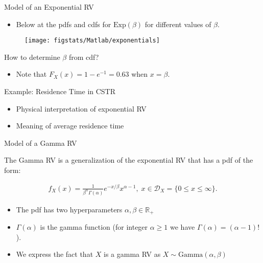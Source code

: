 \documentclass[9pt]{beamer}
\begin{document}
%
\begin{frame}{Model of an Exponential RV}
\begin{itemize}
\item Below at the pdfs and cdfs for $\textrm{Exp}(\beta)$ for different values of $\beta$.
\end{itemize}
\begin{figure}[!htb]
    \centering
	\texttt{[image: figstats/Matlab/exponentials]}
\end{figure}
\begin{block}{}
\begin{center}
How to determine $\beta$ from cdf? 
\end{center}
\end{block}
\pause
\begin{itemize}
\item Note that $F_X(x)=1-e^{-1}=0.63$ when $x=\beta$. 
\end{itemize}
\end{frame}

%
\begin{frame}{Example: Residence Time in CSTR}
\begin{block}{}
\begin{itemize}
\item Physical interpretation of exponential RV
\item Meaning of average residence time
\end{itemize}
\end{block}
\begin{center}
\end{center}
\end{frame}

%
\begin{frame}{Model of a Gamma RV}

The Gamma RV is a generalization of the exponential RV that has a pdf of the form:
\begin{block}{}
\begin{align*}
f_X(x)=\frac{1}{\beta^\alpha \Gamma(\alpha)}e^{-x/\beta}x^{\alpha-1},\; x\in \mathcal{D}_X=\{0\leq x\leq \infty\}.
\end{align*}
\end{block}
\begin{itemize}
\item The pdf has two hyperparameters $\alpha,\beta\in \mathbb{R}_+$
\item $\Gamma(\alpha)$ is the gamma function (for integer $\alpha\geq 1$ we have $\Gamma(\alpha)=(\alpha-1)!$). 
\item We express the fact that $X$ is a gamma RV as $X\sim \textrm{Gamma}(\alpha,\beta)$
\end{itemize}

\end{frame}
\end{document}
